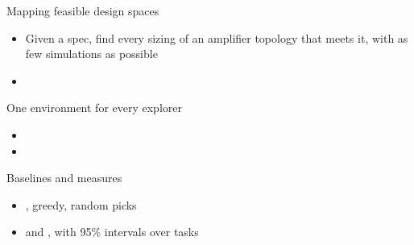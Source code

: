 

\begin{frame}{Mapping feasible design spaces}
  \begin{itemize}
    \item Given a spec, find \alert{every sizing} of an amplifier topology that meets it, with as few simulations as possible
    \item {}
  \end{itemize}
\end{frame}


\begin{frame}{One environment for every explorer}
  \begin{itemize}
    \item {}
    \item {}
  \end{itemize}
\end{frame}

\begin{frame}{Baselines and measures}
  \begin{itemize}
    \item {}, greedy, random picks
    \item \passfail{} and \prederr{}, with 95\% intervals over tasks
  \end{itemize}
\end{frame}

